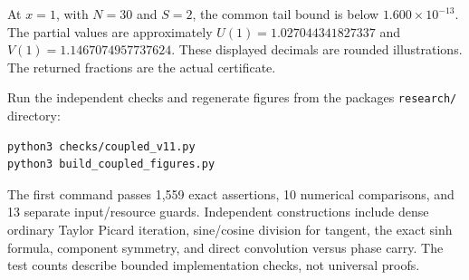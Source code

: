 At \(x=1\), with \(N=30\) and \(S=2\), the common tail bound is below
\(1.600\times10^{-13}\). The partial values are approximately
\(U(1)=1.027044341827337\) and \(V(1)=1.1467074957737624\). These
displayed decimals are rounded illustrations. The returned fractions are
the actual certificate.

Run the independent checks and regenerate figures from the package\textquotesingle s \texttt{research/} directory:

\begin{verbatim}
python3 checks/coupled_v11.py
python3 build_coupled_figures.py
\end{verbatim}

The first command passes 1,559 exact assertions, 10 numerical
comparisons, and 13 separate input/resource guards. Independent
constructions include dense ordinary Taylor Picard iteration,
sine/cosine division for tangent, the exact sinh formula, component
symmetry, and direct convolution versus phase carry. The test counts
describe bounded implementation checks, not universal proofs.
